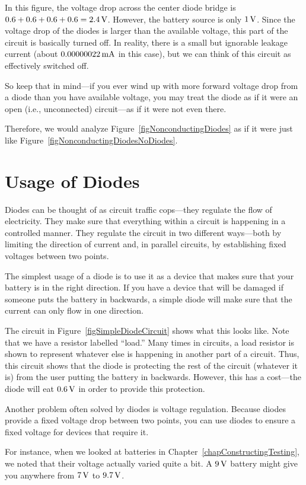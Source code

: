 
In this figure, the voltage drop across the center diode bridge is $0.6 + 0.6 + 0.6 + 0.6 = 2.4\,\si{\volt}$.
However, the battery source is only $1\,\si{\volt}$.
Since the voltage drop of the diodes is larger than the available voltage, this part of the circuit is basically turned off.
In reality, there is a small but ignorable leakage current (about $0.00000022\,\si{\milli\ampere}$ in this case), but we can think of this circuit as effectively switched off.

So keep that in mind---if you ever wind up with more forward voltage drop from a diode than you have available voltage, you may treat the diode as if it were an open (i.e., unconnected) circuit---as if it were not even there.

Therefore, we would analyze Figure~\ref{figNonconductingDiodes} as if it were just like Figure~\ref{figNonconductingDiodesNoDiodes}.


\section{Usage of Diodes}

Diodes can be thought of as circuit traffic cops---they regulate the flow of electricity.
They make sure that everything within a circuit is happening in a controlled manner.
They regulate the circuit in two different ways---both by limiting the direction of current and, in parallel circuits, by establishing fixed voltages between two points.

The simplest usage of a diode is to use it as a device that makes sure that your battery is in the right direction.
If you have a device that will be damaged if someone puts the battery in backwards, a simple diode will make sure that the current can only flow in one direction.

The circuit in Figure~\ref{figSimpleDiodeCircuit} shows what this looks like.
Note that we have a resistor labelled ``load.''  
Many times in circuits, a load resistor is shown to represent whatever else is happening in another part of a circuit.
Thus, this circuit shows that the diode is protecting the rest of the circuit (whatever it is) from the user putting the battery in backwards.
However, this has a cost---the diode will eat $0.6\,\si{\volt}$ in order to provide this protection.

Another problem often solved by diodes is voltage regulation.
Because diodes provide a fixed voltage drop between two points, you can use diodes to ensure a fixed voltage for devices that require it.

For instance, when we looked at batteries in Chapter~\ref{chapConstructingTesting}, we noted that their voltage actually varied quite a bit.
A $9\,\si{\volt}$ battery might give you anywhere from $7\,\si{\volt}$ to $9.7\,\si{\volt}$.

